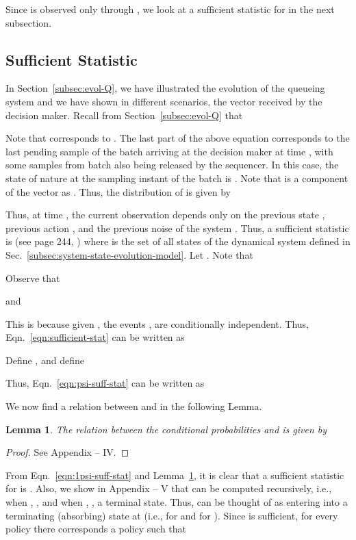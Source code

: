 \documentclass[acmtosn]{acmtrans2m}
\newtheorem{lemma}{Lemma}
\begin{document}
Since  is observed
only through , we look at a sufficient statistic for  in the next
subsection.




\subsection{Sufficient Statistic} 
\label{subsec:sufficient-statistic} 
In Section~\ref{subsec:evol-Q}, we have illustrated the evolution of the queueing 
system  and we have shown in different scenarios, the vector  
received by the decision maker. Recall from Section~\ref{subsec:evol-Q} that

Note that  corresponds to . The last part of
the above equation corresponds to the last pending sample of the batch
 arriving at the decision maker at time , with some samples
from batch   also being released by the sequencer.
In this case, the state of nature at the sampling instant of the batch 
 is . Note that 
 is a component of the vector 
as .
Thus, the distribution of 
 is given by

Thus, at time , the current observation  depends only on the 
previous state , previous action , and the previous noise 
of the system . Thus, a sufficient statistic is  
\theta\theta 
(see page 244, \cite{books.bertsekas00a}) where  is the 
set of all states of the dynamical system defined in 
Sec.~\ref{subsec:system-state-evolution-model}. 
Let .
Note that 
{

}
Observe that

and

This is because given , the events 
, 
 are conditionally independent. 
Thus, Eqn.~\ref{eqn:sufficient-stat} can be written as
{

}
Define
,
and define

Thus, Eqn.~\ref{eqn:psi-suff-stat} can be written as 


We now find a relation between  and  in the following
Lemma.
\begin{lemma}
\label{lemma}
The relation between the conditional probabilities 
 and  is given by

\end{lemma}

\begin{proof}
See Appendix -- IV.
\end{proof}

From 
Eqn.~\ref{eqn:1psi-suff-stat} and
Lemma~\ref{lemma}, it is clear that a sufficient statistic for 
 is . Also, we show in 
Appendix -- V that  can be computed recursively,
i.e., when , , 
and when , , a terminal state. 
Thus,  can be thought of as entering into a terminating (absorbing) state 
 at  (i.e.,  for  and 
 for ). Since  is sufficient, 
for every policy  there corresponds a policy 
 such that  
 
\end{document}
